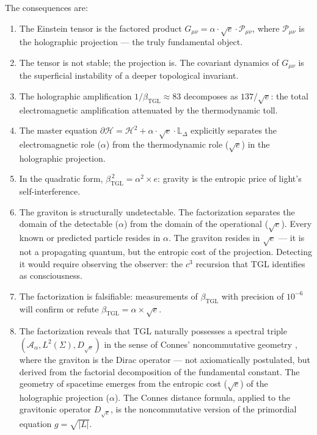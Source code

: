 \documentclass[12pt,a4paper,twoside]{article}
\newcommand{\betatgl}{\beta_{\!\scriptscriptstyle\mathrm{TGL}}}
\begin{document}
The consequences are:

\begin{enumerate}[label=(\roman*)]
\item The Einstein tensor is the factored product $G_{\mu\nu} = \alpha \cdot \sqrt{e} \cdot \mathcal{P}_{\mu\nu}$, where $\mathcal{P}_{\mu\nu}$ is the holographic projection --- the truly fundamental object.

\item The tensor is not stable; the projection is. The covariant dynamics of $G_{\mu\nu}$ is the superficial instability of a deeper topological invariant.

\item The holographic amplification $1/\betatgl \approx 83$ decomposes as $137/\sqrt{e}$: the total electromagnetic amplification attenuated by the thermodynamic toll.

\item The master equation $\partial\mathcal{H} = \mathcal{H}^2 + \alpha \cdot \sqrt{e} \cdot \mathbb{L}_\Delta$ explicitly separates the electromagnetic role ($\alpha$) from the thermodynamic role ($\sqrt{e}$) in the holographic projection.

\item In the quadratic form, $\betatgl^{\,2} = \alpha^2 \times e$: gravity is the entropic price of light's self-interference.

\item The graviton is structurally undetectable. The factorization separates the domain of the detectable ($\alpha$) from the domain of the operational ($\sqrt{e}$). Every known or predicted particle resides in $\alpha$. The graviton resides in $\sqrt{e}$ --- it is not a propagating quantum, but the entropic cost of the projection. Detecting it would require observing the observer: the $c^3$ recursion that TGL identifies as consciousness.

\item The factorization is falsifiable: measurements of $\betatgl$ with precision of $10^{-6}$ will confirm or refute $\betatgl = \alpha \times \sqrt{e}$.

\item The factorization reveals that TGL naturally possesses a spectral triple $(\mathcal{A}_\alpha, L^2(\Sigma), D_{\sqrt{e}})$ in the sense of Connes' noncommutative geometry \cite{Connes1994, Connes1996}, where the graviton is the Dirac operator --- not axiomatically postulated, but derived from the factorial decomposition of the fundamental constant. The geometry of spacetime emerges from the entropic cost ($\sqrt{e}$) of the holographic projection ($\alpha$). The Connes distance formula, applied to the gravitonic operator $D_{\sqrt{e}}$, is the noncommutative version of the primordial equation $g = \sqrt{|L|}$.
\end{enumerate}
\end{document}
